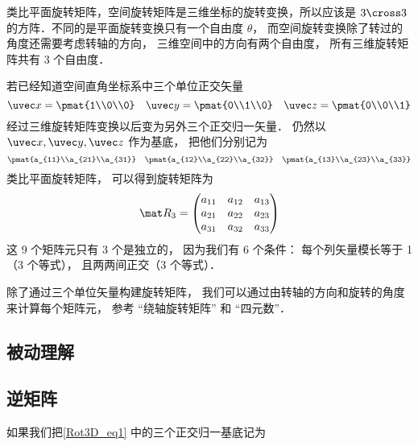 
\begin{issues}
\issueDraft
\end{issues}


类比平面旋转矩阵，空间旋转矩阵是三维坐标的旋转变换，所以应该是 $3 \cross 3$ 的方阵．不同的是平面旋转变换只有一个自由度 $\theta $， 而空间旋转变换除了转过的角度还需要考虑转轴的方向， 三维空间中的方向有两个自由度， 所有三维旋转矩阵共有 3 个自由度．

若已经知道空间直角坐标系中三个单位正交矢量
\begin{equation}
\uvec x=\pmat{1\\0\\0} \quad \uvec y=\pmat{0\\1\\0} \quad \uvec z=\pmat{0\\0\\1}
\end{equation}
经过三维旋转矩阵变换以后变为另外三个正交归一矢量． 仍然以 $\uvec x, \uvec y, \uvec z$ 作为基底， 把他们分别记为
\begin{equation}\label{Rot3D_eq1}
\pmat{a_{11}\\a_{21}\\a_{31}} \quad \pmat{a_{12}\\a_{22}\\a_{32}} \quad \pmat{a_{13}\\a_{23}\\a_{33}}
\end{equation}
类比平面旋转矩阵， 可以得到旋转矩阵为
\begin{equation}
\mat R_3 = \begin{pmatrix}
{a_{11}}&{a_{12}}&{a_{13}}\\
{a_{21}}&{a_{22}}&{a_{23}}\\
{a_{31}}&{a_{32}}&{a_{33}}
\end{pmatrix}\end{equation}
这 9 个矩阵元只有 3 个是独立的， 因为我们有 6 个条件： 每个列矢量模长等于 1（3 个等式）， 且两两间正交（3 个等式）．

除了通过三个单位矢量构建旋转矩阵， 我们可以通过由转轴的方向和旋转的角度来计算每个矩阵元， 参考 “绕轴旋转矩阵” 和 “四元数”．

\subsection{被动理解}


\subsection{逆矩阵}
如果我们把\autoref{Rot3D_eq1} 中的三个正交归一基底记为 


